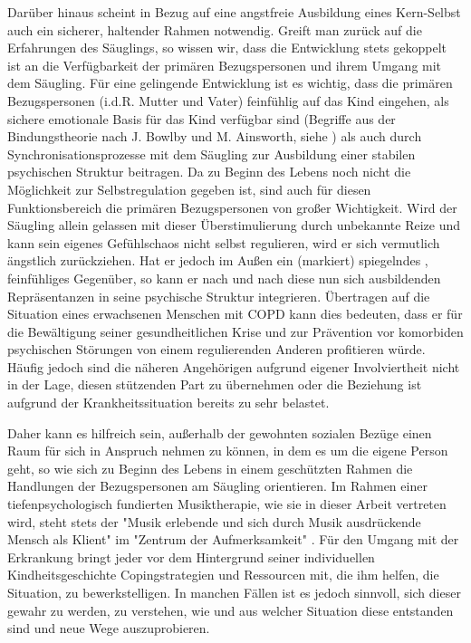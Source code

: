 Darüber hinaus scheint in Bezug auf eine angstfreie Ausbildung eines Kern-Selbst auch ein sicherer, haltender Rahmen notwendig. Greift man zurück auf die Erfahrungen des Säuglings, so wissen wir, dass die Entwicklung stets gekoppelt ist an die Verfügbarkeit der primären Bezugspersonen und ihrem Umgang mit dem Säugling. Für eine gelingende Entwicklung ist es wichtig, dass die primären Bezugspersonen (i.d.R. Mutter und Vater) feinfühlig auf das Kind eingehen, als sichere emotionale Basis für das Kind verfügbar sind (Begriffe aus der Bindungstheorie nach J. Bowlby und M. Ainsworth, siehe \cite{brisch2013}) als auch durch Synchronisationsprozesse mit dem Säugling zur Ausbildung einer stabilen psychischen Struktur beitragen. Da zu Beginn des Lebens noch nicht die Möglichkeit zur Selbstregulation gegeben ist, sind auch für diesen Funktionsbereich die primären Bezugspersonen von großer Wichtigkeit. Wird der Säugling allein gelassen mit dieser Überstimulierung durch unbekannte Reize und kann sein eigenes Gefühlschaos nicht selbst regulieren, wird er sich vermutlich ängstlich zurückziehen. Hat er jedoch im Außen ein (markiert) spiegelndes \autocite[vgl.][153]{fonagy2004}, feinfühliges Gegenüber, so kann er nach und nach diese nun sich ausbildenden Repräsentanzen in seine psychische Struktur integrieren. 
Übertragen auf die Situation eines erwachsenen Menschen mit COPD kann dies bedeuten, dass er für die Bewältigung seiner gesundheitlichen Krise und zur Prävention vor komorbiden psychischen Störungen von einem regulierenden Anderen profitieren würde. Häufig jedoch sind die näheren Angehörigen aufgrund eigener Involviertheit nicht in der Lage, diesen stützenden Part zu übernehmen oder die Beziehung ist aufgrund der Krankheitssituation bereits zu sehr belastet. 

Daher kann es hilfreich sein, außerhalb der gewohnten sozialen Bezüge einen Raum für sich in Anspruch nehmen zu können, in dem es um die eigene Person geht, so wie sich zu Beginn des Lebens in einem geschützten Rahmen die Handlungen der Bezugspersonen am Säugling orientieren. Im Rahmen einer tiefenpsychologisch fundierten Musiktherapie, wie sie in dieser Arbeit vertreten wird, steht stets der "Musik erlebende und sich durch Musik ausdrückende Mensch als Klient" im "Zentrum der Aufmerksamkeit" \autocite[4]{timmermann2004}. Für den Umgang mit der Erkrankung bringt jeder vor dem Hintergrund seiner individuellen Kindheitsgeschichte Copingstrategien und Ressourcen mit, die ihm helfen, die Situation, zu bewerkstelligen. In manchen Fällen ist es jedoch sinnvoll, sich dieser gewahr zu werden, zu verstehen, wie und aus welcher Situation diese entstanden sind und neue Wege auszuprobieren. 

